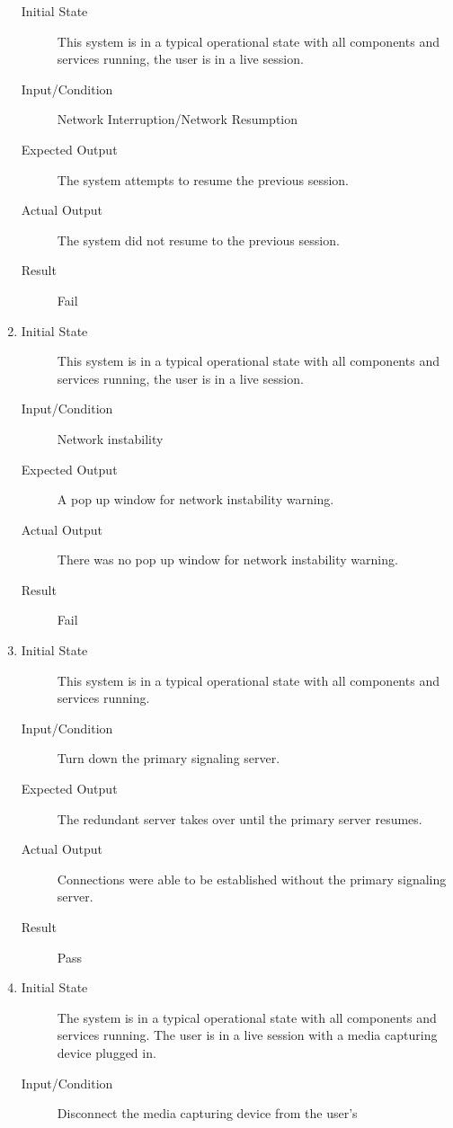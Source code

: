 \documentclass[12pt, titlepage]{article}
\begin{document}
\begin{enumerate}[NFR-T1]
\begin{description}
    \item[Initial State] This system is in a typical operational state with all
      components and services running, the user is in a live session.
    \item[Input/Condition] Network Interruption/Network Resumption
    \item[Expected Output] The system attempts to resume the previous session.
    \item[Actual Output] The system did not resume to the previous session.
    \item[Result] Fail
    \end{description}
  \item \label{NFRT8}
    \begin{description}
    \item[Initial State] This system is in a typical operational state with all
      components and services running, the user is in a live session.
    \item[Input/Condition] Network instability
    \item[Expected Output] A pop up window for network instability warning.
    \item[Actual Output] There was no pop up window for network instability warning.
    \item[Result] Fail
    \end{description}
  \item \label{NFRT9}
    \begin{description}
    \item[Initial State] This system is in a typical operational state with all
      components and services running.
    \item[Input/Condition] Turn down the primary signaling server.
    \item[Expected Output] The redundant server takes over until the primary server
      resumes.
    \item[Actual Output] Connections were able to be established without the primary 
    signaling server.
    \item[Result] Pass 
    \end{description}
  \item \label{NFRT10}
    \begin{description}
    \item[Initial State] The system is in a typical operational state with all
      components and services running. The user is in a live session with a media
      capturing device plugged in.
    \item[Input/Condition] Disconnect the media capturing device from the user’s

\end{description}
\end{enumerate}
\end{document}

